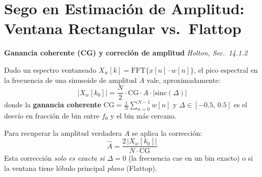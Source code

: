 \documentclass[11pt, a4paper]{article}
\begin{document}
\section{Sego en Estimaci\'on de Amplitud: Ventana Rectangular vs.\ Flattop}

\begin{conceptbox}
\textbf{Ganancia coherente (CG) y correci\'on de amplitud} \hfill \small\textit{Holton, Sec.~14.1.2}

\smallskip
Dado un espectro ventaneado $X_w[k] = \text{FFT}\{x[n]\cdot w[n]\}$, el pico espectral en
la frecuencia de una sinusoide de amplitud $A$ vale, aproximadamente:
$$|X_w[k_0]| = \frac{N}{2}\cdot \text{CG}\cdot A \cdot |\text{sinc}(\Delta)|$$
donde la \textbf{ganancia coherente} $\text{CG} = \tfrac{1}{N}\sum_{n=0}^{N-1}w[n]$
y $\Delta \in [-0.5,\,0.5]$ es el desvío en fracci\'on de bin entre $f_0$ y el bin m\'as
cercano.

Para recuperar la amplitud verdadera $A$ se aplica la correcci\'on:
$$\hat{A} = \frac{2\,|X_w[k_0]|}{N\cdot\text{CG}}$$
Esta correcci\'on \emph{solo es exacta si $\Delta = 0$} (la frecuencia cae en un bin
exacto) o si la ventana tiene l\'obulo principal \emph{plano} (Flattop).
\end{conceptbox}
\end{document}
